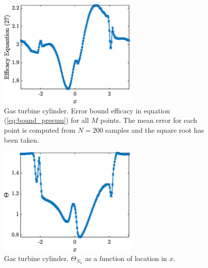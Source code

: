 \documentclass{report}
\begin{document}
\begin{figure}[ht!]
\centering
\includegraphics[width =0.6\textwidth]{Figures/GT_cylinder_eq_27_efficacy.eps}
\caption{Gas turbine cylinder. Error bound efficacy in equation (\ref{eq:bound_presum}) for all $M$ points. The mean error for each point is computed from $N=200$ samples and the square root has been taken.} 
\label{fig:GT_cylinder_eq_27_efficacy}
\end{figure}
%

% 
\begin{figure}[ht!]
\centering
\includegraphics[width =0.6\textwidth]{Figures/GT_cylinder_theta.eps}
\caption{Gas turbine cylinder. $\Theta_{N_h}$ as a function of location in $x$.} 
\label{fig:GT_cylinder_theta}
\end{figure}
%
\end{document}
